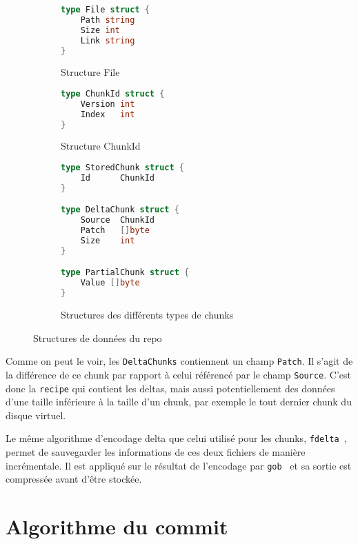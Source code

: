 \documentclass[a4paper]{report}
\begin{document}
\begin{figure}[ht]
\centering
\begin{subfigure}[t]{.45\textwidth}
\begin{lstlisting}[language=Go]
type File struct {
    Path string
    Size int
    Link string
}
\end{lstlisting}
\caption{Structure File}
\label{fig:type-file-struct}
\hfill
\begin{lstlisting}[language=Go]
type ChunkId struct {
    Version int
    Index   int
}
\end{lstlisting}
\caption{Structure ChunkId}
\label{fig:type-chunkid-struct}
\end{subfigure}
\hfil
\begin{subfigure}[t]{.45\textwidth}
\begin{lstlisting}[language=Go]
type StoredChunk struct {
    Id      ChunkId
}

type DeltaChunk struct {
    Source  ChunkId
    Patch   []byte
    Size    int
}

type PartialChunk struct {
    Value []byte
}
\end{lstlisting}
\caption{Structures des différents types de chunks\protect\footnotemark}
\label{fig:type-chunks-struct}
\end{subfigure}
\caption{Structures de données du repo}
\label{fig:repo-type-struct}
\end{figure}

Comme on peut le voir, les \verb|DeltaChunks| contiennent un champ \verb|Patch|.
Il s'agit de la différence de ce chunk par rapport à celui référencé par le champ \verb|Source|.
C'est donc la \verb|recipe| qui contient les deltas,
mais aussi potentiellement des données d'une taille inférieure à la taille d'un chunk,
par exemple le tout dernier chunk du disque virtuel.

Le même algorithme d'encodage delta que celui utilisé pour les chunks,
\verb|fdelta|~\cite{hipp2006fdelta},
permet de sauvegarder les informations de ces deux fichiers de manière incrémentale.
Il est appliqué sur le résultat de l'encodage par \verb|gob|~\cite{pike2011gob}
et sa sortie est compressée avant d'être stockée.

\section{Algorithme du commit}
\end{document}
